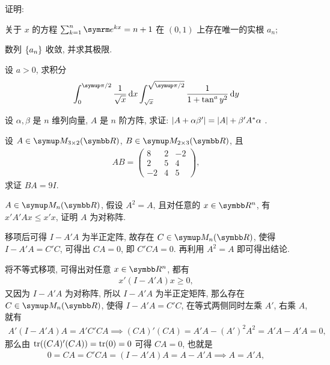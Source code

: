 \begin{exercise}[series=exer]
  \item 证明: \begin{exercise}
      \item 关于 $ x $ 的方程 $ \sum_{k=1}^{n} \me^{kx} = n + 1 $ 在 $ (0, 1) $ 上存在唯一的实根 $ a_{n} $;
      \item 数列 $ \qty{a_{n}} $ 收敛, 并求其极限.
  \end{exercise}
  \item 设 $ a > 0 $, 求积分
  \begin{align*}
      \int_{0}^{\pi/2} \frac{1}{\sqrt{x}} \dx* \int_{\sqrt{x}}^{\sqrt{\pi/2}} \frac{1}{1 + \tan^{a}y^{2}} \dd{y}
  \end{align*}
  \item 设 $ \alpha, \beta $ 是 $ n $ 维列向量, $ A $ 是 $ n $ 阶方阵, 求证: $ \abs{A + \alpha\beta'} = \abs{A} + \beta'A^{*}\alpha $ .
  \item 设 $ A \in \MM[\R][3\times 2] $, $ B \in \MM[\R][2 \times 3] $, 且
  \begin{align*}
      AB = \begin{pmatrix}
          8 & 2 & -2 \\
          2 & 5 & 4 \\
          -2 & 4 & 5
      \end{pmatrix},
  \end{align*}
  求证 $ BA = 9 I $.
  \item $ A\in \MM $, 假设 $ A^{2} = A $, 且对任意的 $ x \in \R^{n} $, 有 $ x'A'Ax \le x'x $, 证明 $ A $ 为对称阵.
  \begin{hint}
      移项后可得 $ I - A'A $ 为半正定阵, 故存在 $ C \in \MM $, 使得 $ I - A'A = C'C $, 可得出 $ CA = 0 $, 即 $ C'CA = 0 $. 再利用 $ A^{2} = A $ 即可得出结论.
  \end{hint}
  \begin{answer}
      将不等式移项, 可得出对任意 $ x \in \R^{n} $, 都有
      \begin{align*}
          x'(I - A'A)x \ge 0,
      \end{align*}
      又因为 $ I - A'A $ 为对称阵, 所以 $ I - A'A $ 为半正定矩阵, 那么存在 $ C \in \MM $, 使得 $ I - A'A = C'C $, 在等式两侧同时左乘 $ A' $, 右乘 $ A $, 就有
      \begin{align*}
          A'(I - A'A)A = A'C'CA \implies (CA)'(CA) = A'A - (A')^{2}A^{2} = A'A - A'A = 0,
      \end{align*}
      那么由 $ \tr((CA)'(CA)) = \tr(0) = 0 $ 可得 $ CA = 0 $, 也就是
      \begin{align*}
          0 = CA = C'CA = (I - A'A)A = A - A'A \implies A = A'A,

\end{align*}
\end{answer}
\end{exercise}
